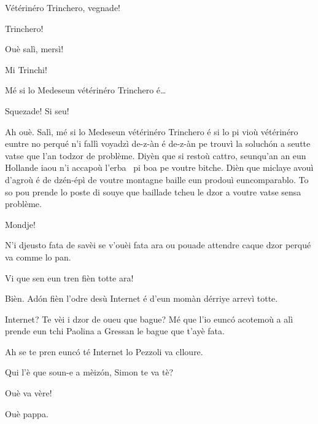 \begin{drama}

\Chefspeaks Vétérinéro Trinchero, vegnade!


\Tuttispeaks Trinchero!


\Trincherospeaks{} Ouè salì, mersì!

\Mariettospeaks Mi Trinchi!

\Trincherospeaks{} Mé si lo Medeseun vétérinéro Trinchero é\ldots

\Cienspeaks Squezade! Si seu!


\Trincherospeaks Ah ouè.  Salì, mé si lo Medeseun vétérinéro Trinchero é si lo pi vioù vétérinéro euntre no perqué n’i fallì voyadzì de-z-àn é de-z-àn pe trouvì la soluch\'on a seutte vatse que l’an todzor de problème. Diyèn que si restoù cattro, seunqu'an an eun Hollande iaou n’i accapoù l’erba \cannabis\ pi boa pe voutre bitche. Dièn que miclaye avouì d’agroù é de dzén-épì de voutre montagne baille eun prodouì euncomparablo. To so pou prende lo poste di souye que ba\-illa\-de tcheu le dzor a voutre vatse sensa problème.

\Cienspeaks Mondje!

\Trincherospeaks N’i djeusto fata de savèi se v'ouèi fata ara ou pouade attendre caque dzor perqué va comme lo pan.

\Cienspeaks Vi que sen eun tren fièn totte ara!

\Trincherospeaks Bièn. Ad\'on fièn l’odre desù Internet é d’eun momàn dérriye arrevì totte.


\Cienspeaks {} Internet? Te vèi i dzor de oueu que bague? Mé que l'io eunc\'o acotemoù a alì prende eun tchi Paolina a Gressan le bague que t’ayè fata. 

\Mariettospeaks Ah se te pren eunc\'o té Internet lo Pezzoli va clloure.


\Cienspeaks Qui l'è que soun-e a mèiz\'on, Simon te va tè?

\Mariettospeaks Ouè va vère!

\Simonspeaks Ouè pappa. 


\end{drama}
